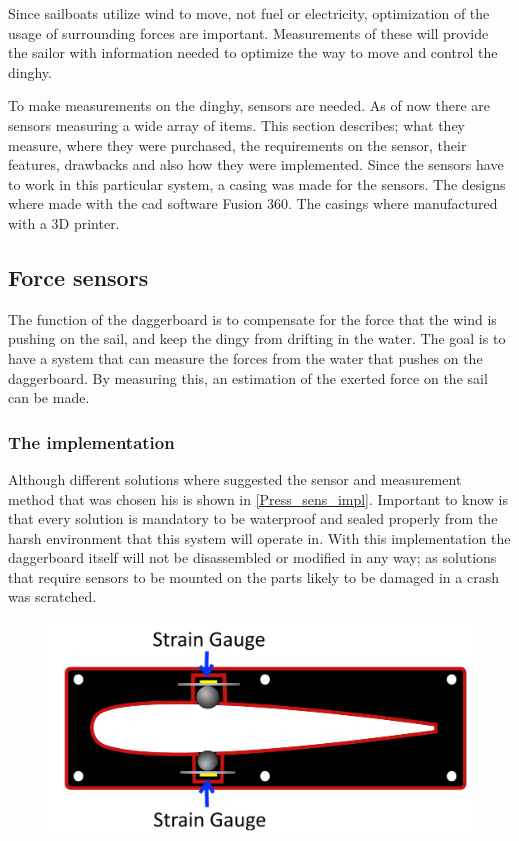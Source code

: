 
Since sailboats utilize wind to move, not fuel or electricity, optimization of the usage of surrounding forces are important. Measurements of these will provide the sailor with information needed to optimize the way to move and control the dinghy.

To make measurements on the dinghy, sensors are needed. As of now there are sensors measuring a wide array of items. This section describes; what they measure, where they were purchased, the requirements on the sensor, their features, drawbacks and also how they were implemented.
Since the sensors have to work in this particular system, a casing was made for the sensors.
The designs where made with the \gls{cad} software Fusion 360\cite{cad}. The casings where manufactured with a 3D printer.

\subsection{Force sensors}
The function of the daggerboard is to compensate for the force that the wind is pushing on the sail, and keep the dingy from drifting in the water. The goal is to have a system that can measure the forces from the water that pushes on the daggerboard. By measuring this, an estimation of the exerted force on the sail can be made. 


\subsubsection{The implementation}
Although different solutions where suggested the sensor and measurement method that was chosen his is shown in \autoref{Press_sens_impl}. 
Important to know is that every solution is mandatory to be waterproof and sealed properly from the harsh environment that this system will operate in. 
With this implementation the daggerboard itself will not be disassembled or modified in any way; as solutions that require sensors to be mounted on the parts likely to be damaged in a crash was scratched.

\begin{figure}[H]
\begin{center}
	\includegraphics[width = .7\textwidth]{Figures/Prototyp_1.png}
	\label{Press_sens_impl}
\end{center}
\end{figure}

